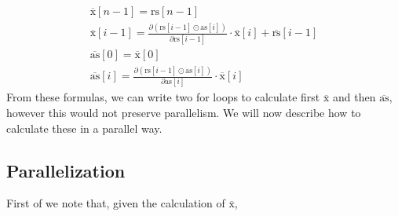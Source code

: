 \documentclass{article}
\newcommand{\ors}{\overline{\text{rs}}}
\newcommand{\rs}{\text{rs}}
\newcommand{\oas}{\overline{\text{as}}}
\newcommand{\xo}{\overline{\text{x}}}
\newcommand{\as}{\text{as}}
\begin{document}
\begin{align*}
	\xo [n-1] = \rs [n-1]      \\
	\xo [i-1] = \frac{\partial (\rs [i-1] \odot \as[i])}{\partial \rs[i-1]}
	\cdot \xo[i]   + \ors[i-1] \\
	\oas [0] = \xo[0]          \\
	\oas [i] = \frac{\partial (\rs [i-1] \odot \as[i])}{\partial \as[i]}
	\cdot
	\xo[i]
\end{align*}
From these formulas, we can write two for loops to calculate first \(\xo\)
and then \(\oas\),
however this would not preserve parallelism. We will now describe how to
calculate these in a parallel way.
\subsection{Parallelization}
First of we note that,
given the calculation of \(\xo\),

\newpage
\end{document}
